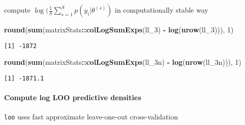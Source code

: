 \documentclass[
]{article}
\newenvironment{Shaded}{\begin{snugshade}}{\end{snugshade}}
\newcommand{\DecValTok}[1]{\textcolor[rgb]{0.00,0.00,0.81}{#1}}
\newcommand{\KeywordTok}[1]{\textcolor[rgb]{0.13,0.29,0.53}{\textbf{#1}}}
\newcommand{\NormalTok}[1]{#1}
\newcommand{\OperatorTok}[1]{\textcolor[rgb]{0.81,0.36,0.00}{\textbf{#1}}}
\newcommand{\StringTok}[1]{\textcolor[rgb]{0.31,0.60,0.02}{#1}}
\begin{document}
compute \(\log(\frac{1}{S}\sum_{s=1}^S p(y_i|\theta^{(s)})\) in
computationally stable way

\begin{Shaded}
\begin{Highlighting}[]
\KeywordTok{round}\NormalTok{(}\KeywordTok{sum}\NormalTok{(matrixStats}\OperatorTok{::}\KeywordTok{colLogSumExps}\NormalTok{(ll_}\DecValTok{3}\NormalTok{) }\OperatorTok{-}\StringTok{ }\KeywordTok{log}\NormalTok{(}\KeywordTok{nrow}\NormalTok{(ll_}\DecValTok{3}\NormalTok{))), }\DecValTok{1}\NormalTok{)}
\end{Highlighting}
\end{Shaded}

\begin{verbatim}
[1] -1872
\end{verbatim}

\begin{Shaded}
\begin{Highlighting}[]
\KeywordTok{round}\NormalTok{(}\KeywordTok{sum}\NormalTok{(matrixStats}\OperatorTok{::}\KeywordTok{colLogSumExps}\NormalTok{(ll_3n) }\OperatorTok{-}\StringTok{ }\KeywordTok{log}\NormalTok{(}\KeywordTok{nrow}\NormalTok{(ll_3n))), }\DecValTok{1}\NormalTok{)}
\end{Highlighting}
\end{Shaded}

\begin{verbatim}
[1] -1871.1
\end{verbatim}

\hypertarget{compute-log-loo-predictive-densities-1}{%
\paragraph{Compute log LOO predictive
densities}\label{compute-log-loo-predictive-densities-1}}

\texttt{loo} uses fast approximate leave-one-out cross-validation

\begin{Shaded}
\end{Shaded}
\end{document}
